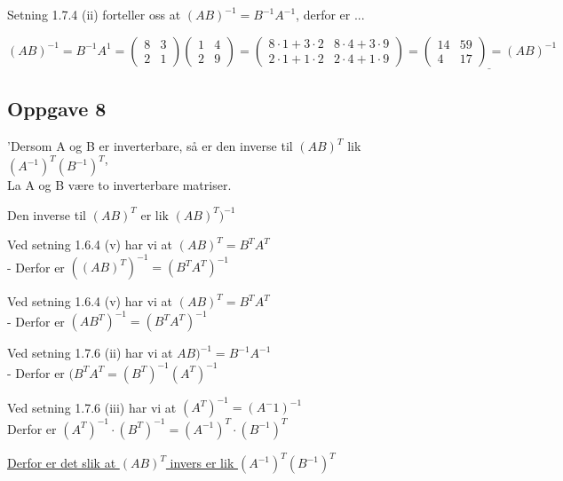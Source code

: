 \documentclass{article}
\begin{document}
Setning 1.7.4 (ii) forteller oss at \( (AB)^{-1} = B^{-1}A^{-1}\), derfor er ...

\[(AB)^{-1} = B^{-1}A^{1} = \begin{pmatrix}
    8 & 3 \\ 2 & 1
\end{pmatrix}\begin{pmatrix}
    1 & 4 \\ 2 & 9
\end{pmatrix} = \begin{pmatrix}
    8 \cdot 1 + 3 \cdot 2 & 8 \cdot 4 + 3 \cdot 9 \\ 2 \cdot 1 + 1 \cdot 2 & 2 \cdot 4 + 1 \cdot 9
\end{pmatrix} = \underline{\begin{pmatrix}
    14 & 59 \\ 4 & 17
\end{pmatrix} = (AB)^{-1}}\]

\hfill

\subsection*{Oppgave 8}

'Dersom A og B er inverterbare, så er den inverse til \((AB)^T\) lik \((A^{-1})^T (B^{-1})^T\)' \\
La A og B være to inverterbare matriser.

Den inverse til \((AB)^T \text{ er lik } (AB)^T)^{-1}\)

Ved setning 1.6.4 (v) har vi at \((AB)^T = B ^T A^T\) \\
- Derfor er \(((AB)^T)^{-1} = (B^T A^T)^{-1}\)

\newline
Ved setning 1.6.4 (v) har vi at \((AB)^T =B^T A^T \) \\
- Derfor er \((AB^T)^{-1}  = (B^TA^T)^{-1}\)

\newline
Ved setning 1.7.6 (ii) har vi at \(AB)^{-1} = B^{-1}A^{-1}\) \\
- Derfor er \((B^T A^T = (B^T)^{-1}(A^T)^{-1}\)

\newline
Ved setning 1.7.6 (iii) har vi at \((A^T)^{-1} = (A^-1)^{-1}\) \\
Derfor er \((A^T)^{-1} \cdot (B^T)^{-1} = (A^{-1})^T \cdot (B^{-1})^T\)

\underline{Derfor er det slik at \((AB)^T\) invers er lik \((A^{-1})^T (B^{-1})^T\)}
\end{document}
